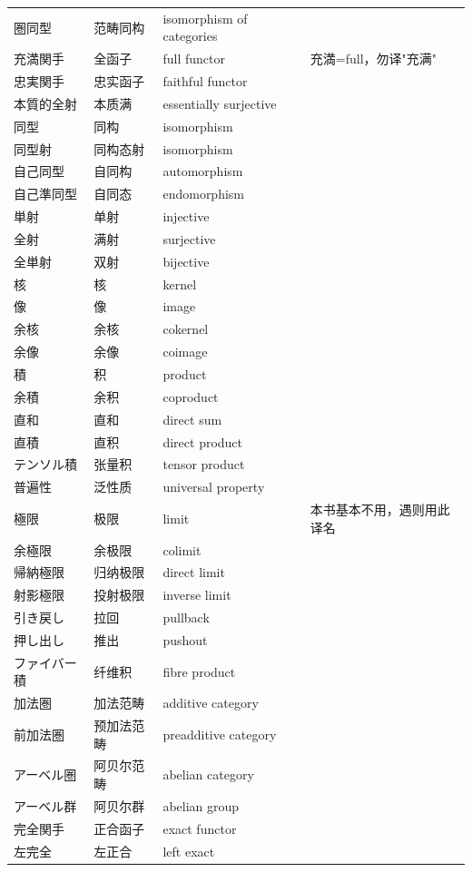 \begin{longtable}{p{}p{}p{}p{}}
圏同型 & 范畴同构 & isomorphism of categories &  \\
充満関手 & 全函子 & full functor & 充満=full，勿译"充满" \\
忠実関手 & 忠实函子 & faithful functor &  \\
本質的全射 & 本质满 & essentially surjective &  \\
同型 & 同构 & isomorphism &  \\
同型射 & 同构态射 & isomorphism &  \\
自己同型 & 自同构 & automorphism &  \\
自己準同型 & 自同态 & endomorphism &  \\
単射 & 单射 & injective &  \\
全射 & 满射 & surjective &  \\
全単射 & 双射 & bijective &  \\
核 & 核 & kernel &  \\
像 & 像 & image &  \\
余核 & 余核 & cokernel &  \\
余像 & 余像 & coimage &  \\
積 & 积 & product &  \\
余積 & 余积 & coproduct &  \\
直和 & 直和 & direct sum &  \\
直積 & 直积 & direct product &  \\
テンソル積 & 张量积 & tensor product &  \\
普遍性 & 泛性质 & universal property &  \\
極限 & 极限 & limit & 本书基本不用，遇则用此译名 \\
余極限 & 余极限 & colimit &  \\
帰納極限 & 归纳极限 & direct limit &  \\
射影極限 & 投射极限 & inverse limit &  \\
引き戻し & 拉回 & pullback &  \\
押し出し & 推出 & pushout &  \\
ファイバー積 & 纤维积 & fibre product &  \\
加法圏 & 加法范畴 & additive category &  \\
前加法圏 & 预加法范畴 & preadditive category &  \\
アーベル圏 & 阿贝尔范畴 & abelian category &  \\
アーベル群 & 阿贝尔群 & abelian group &  \\
完全関手 & 正合函子 & exact functor &  \\
左完全 & 左正合 & left exact &  \\

\end{longtable}
